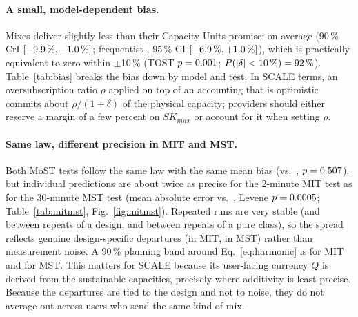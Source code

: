 \paragraph{A small, model-dependent bias.} Mixes deliver slightly less than their Capacity Units
promise: \scaleBiasBayes on average (90\,\% CrI $[-9.9\,\%, -1.0\,\%]$; frequentist
\scaleBiasFreq, 95\,\% CI $[-6.9\,\%, +1.0\,\%]$), which is practically equivalent to
zero within $\pm$10\,\% (TOST $p=0.001$; $P(|\delta|<10\,\%)=92\,\%$).
Table~\ref{tab:bias} breaks the bias down by model and test. In SCALE terms, an oversubscription ratio
$\rho$ applied on top of an accounting that is \scaleBiasBayes optimistic commits about
$\rho/(1+\delta)$ of the physical capacity; providers should either reserve a margin of a few percent
on $SK_{max}$ or account for it when setting $\rho$.

\paragraph{Same law, different precision in MIT and MST.} Both MoST tests follow the same law with the
same mean bias (\scaleBiasDesignMIT vs.\ \scaleBiasDesignMST, $p=0.507$), but individual
predictions are about twice as precise for the 2-minute MIT test as for the 30-minute MST test
(mean absolute error \scaleMaeMIT vs.\ \scaleMaeMST, Levene $p=0.0005$; Table~\ref{tab:mitmst},
Fig.~\ref{fig:mitmst}). Repeated runs are very stable (\scaleSdRunMIT and \scaleSdRunMST between repeats
of a design, \scaleSdRepMIT and \scaleSdRepMST between repeats of a pure class), so the spread reflects
genuine design-specific departures (\scaleSdMixMIT in MIT, \scaleSdMixMST in MST) rather than
measurement noise. A 90\,\% planning band around Eq.~\eqref{eq:harmonic} is \scaleBandMIT for MIT and
\scaleBandMST for MST. This matters for SCALE because its user-facing currency $Q$ is derived from the
sustainable capacities, precisely where additivity is least precise. Because the departures are tied to
the design and not to noise, they do not average out across users who send the same kind of mix.

